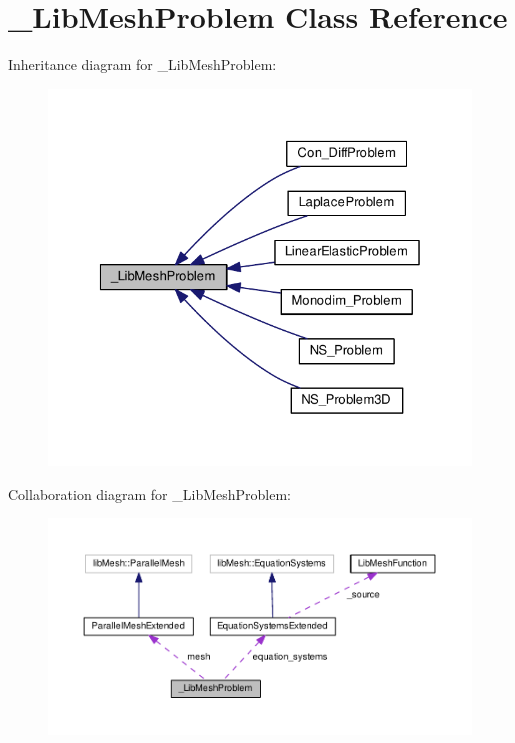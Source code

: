 \hypertarget{class___lib_mesh_problem}{\section{\-\_\-\-Lib\-Mesh\-Problem Class Reference}
\label{class___lib_mesh_problem}
}


Inheritance diagram for \-\_\-\-Lib\-Mesh\-Problem\-:\nopagebreak
\begin{figure}[H]
\begin{center}
\leavevmode
\includegraphics[width=326pt]{class___lib_mesh_problem__inherit__graph}
\end{center}
\end{figure}


Collaboration diagram for \-\_\-\-Lib\-Mesh\-Problem\-:\nopagebreak
\begin{figure}[H]
\begin{center}
\leavevmode
\includegraphics[width=350pt]{class___lib_mesh_problem__coll__graph}
\end{center}
\end{figure}
